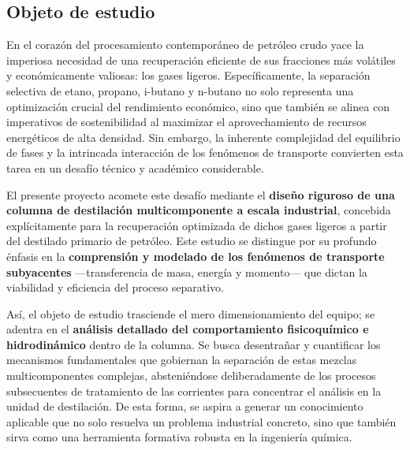 \subsection{Objeto de estudio}
En el corazón del procesamiento contemporáneo de petróleo crudo yace la imperiosa necesidad de una recuperación eficiente de sus fracciones más volátiles y económicamente valiosas: los gases ligeros. Específicamente, la separación selectiva de etano, propano, i-butano y n-butano no solo representa una optimización crucial del rendimiento económico, sino que también se alinea con imperativos de sostenibilidad al maximizar el aprovechamiento de recursos energéticos de alta densidad. Sin embargo, la inherente complejidad del equilibrio de fases y la intrincada interacción de los fenómenos de transporte convierten esta tarea en un desafío técnico y académico considerable.

El presente proyecto acomete este desafío mediante el \textbf{diseño riguroso de una columna de destilación multicomponente a escala industrial}, concebida explícitamente para la recuperación optimizada de dichos gases ligeros a partir del destilado primario de petróleo. Este estudio se distingue por su profundo énfasis en la \textbf{comprensión y modelado de los fenómenos de transporte subyacentes} —transferencia de masa, energía y momento— que dictan la viabilidad y eficiencia del proceso separativo.

Así, el objeto de estudio trasciende el mero dimensionamiento del equipo; se adentra en el \textbf{análisis detallado del comportamiento fisicoquímico e hidrodinámico} dentro de la columna. Se busca desentrañar y cuantificar los mecanismos fundamentales que gobiernan la separación de estas mezclas multicomponentes complejas, absteniéndose deliberadamente de los procesos subsecuentes de tratamiento de las corrientes para concentrar el análisis en la unidad de destilación. De esta forma, se aspira a generar un conocimiento aplicable que no solo resuelva un problema industrial concreto, sino que también sirva como una herramienta formativa robusta en la ingeniería química.
